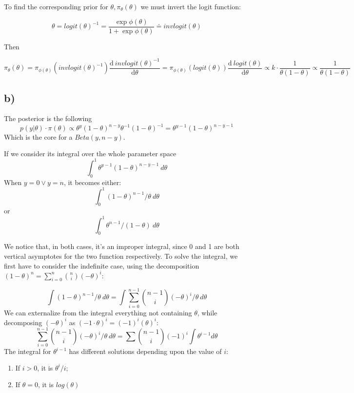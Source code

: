 \documentclass[]{article}
\providecommand{\tightlist}{%
  \setlength{\itemsep}{0pt}\setlength{\parskip}{0pt}}
\begin{document}
To find the corresponding prior for \(\theta, \pi_\theta(\theta)\) we
must invert the logit function:

\[
\theta = logit(\theta)^{-1} = \frac{\exp{\phi(\theta)}}{1+\exp{\phi(\theta)}} \doteq invlogit(\theta)
\]

Then

\[
\pi_\theta(\theta) = \pi_{\phi(\theta)}(invlogit(\theta)^{-1}) \frac{\mathrm{d}\ invlogit(\theta)^{-1}}{\mathrm{d}\theta} =
\pi_{\phi(\theta)}(logit(\theta)) \frac{\mathrm{d}\ logit(\theta)}{\mathrm{d}\theta}
\propto k \cdot \frac{1}{\theta(1-\theta)} \propto   \frac{1}{\theta(1-\theta)}
\]

\subsection{b)}\label{b}

The posterior is the following \[
p(y|\theta)\cdot  \pi(\theta) \propto \theta^y(1-\theta)^{n-y}\theta^{-1}(1-\theta)^{-1} = 
\theta^{y-1}(1-\theta)^{n-y-1} 
\] Which is the core for a \(Beta(y, n-y)\).

If we consider its integral over the whole parameter space \[
\int_0^1\theta^{y-1}(1-\theta)^{n-y-1}\ d\theta
\] When \(y=0 \vee y=n\), it becomes either: \[
\int_0^1(1-\theta)^{n-1}/\theta\ d\theta
\] or \[
\int_0^1\theta^{n-1}/(1-\theta)\ d\theta
\]

We notice that, in both cases, it's an improper integral, since 0 and 1
are both vertical asymptotes for the two function respectively. To solve
the integral, we first have to consider the indefinite case, using the
decomposition \((1-\theta)^{n}=\sum_{i=0}^{n}\binom{n}{i}(-\theta)^i\):

\[
\int(1-\theta)^{n-1}/\theta\ d\theta = \int \sum_{i=0}^{n-1}\binom{n-1}{i}(-\theta)^i/\theta\ d\theta
\] We can externalize from the integral everything not containing
\(\theta\), while decomposing \((-\theta)^i\) as
\((-1\cdot\theta)^i = (-1)^i(\theta)^i\): \[
\sum_{i=0}^{n-1}\binom{n-1}{i}(-\theta)^i/\theta\ d\theta = \sum\binom{n-1}{i}(-1)^i\int\theta^{i-1}d\theta
\] The integral for \(\theta^{i-1}\) has different solutions depending
upon the value of \(i\):

\begin{enumerate}
\def\labelenumi{\arabic{enumi}.}
\tightlist
\item
  If \(i>0\), it is \(\theta^i/i\);
\item
  If \(\theta=0\), it is \(log(\theta)\)
\end{enumerate}
\end{document}
